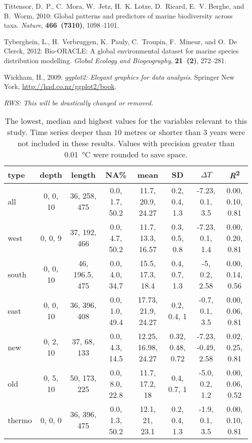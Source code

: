 \documentclass{ametsoc}
\begin{document}
\begin{thebibliography}{23}
Tittensor, D.~P., C.~Mora, W.~Jetz, H.~K. Lotze, D.~Ricard, E.~V. Berghe, and
  B.~Worm, 2010: {Global patterns and predictors of marine biodiversity across
  taxa}. \textit{Nature}, \textbf{466~(7310)}, 1098--1101.

Tyberghein, L., H.~Verbruggen, K.~Pauly, C.~Troupin, F.~Mineur, and O.~{De
  Clerck}, 2012: {Bio-ORACLE: A global environmental dataset for marine species
  distribution modelling}. \textit{Global Ecology and Biogeography},
  \textbf{21~(2)}, 272--281.

Wickham, H., 2009: \textit{ggplot2: Elegant graphics for data analysis}.
  Springer New York, \urlprefix\url{http://had.co.nz/ggplot2/book}.

\end{thebibliography}

%
\emph{RWS: This will be drastically changed or removed.}
\begin{table}[ht]
\caption{\small The lowest, median and highest values for the variables relevant to this study. Time series deeper than 10 metres or shorter than 3 years were not included in these results. Values with precision greater than \SI{0.01}{\degreeCelsius} were rounded to save space.}
\label{range-table}
\centering
\tiny
\begin{tabular}{lccccccc}
\hline
 type & depth & length & NA\% & mean & SD & $\Delta T$ & \emph{R}\textsuperscript{2} \\
 \hline
  all & 0, 0, 10 & 36, 258, 475 & 0.0, 1.7, 50.2 & 11.7, 20.9, 24.27 & 0.2, 0.4, 1.3 & -7.23, 0.1, 3.5 & 0.00, 0.10, 0.81 \\
  west & 0, 0, 9 & 37, 192, 466 & 0.0, 4.7, 50.2 & 11.7, 13.3, 16.57 & 0.3, 0.5, 0.8 & -7.23, 0.1, 1.4 & 0.00, 0.20, 0.81 \\
  south & 0, 0, 10 & 46, 196.5, 475 & 0.0, 4.0, 34.7 & 15.5, 17.3, 18.4 & 0.4, 0.7, 1.3 & -5, 0.2, 2.58 & 0.00, 0.14, 0.56 \\
  east & 0, 0, 10 & 36, 396, 408 & 0.0, 1.0, 49.4 & 17.73, 21.9, 24.27 & 0.2, 0.4, 1 & -0.7, 0.1, 3.5 & 0.00, 0.06, 0.81 \\
  new & 0, 2, 10 & 37, 68, 133 & 0.0, 4.3, 14.5 & 12.25, 16.98, 24.27 & 0.32, 0.48, 0.72 & -7.23, -0.49, 2.58 & 0.02, 0.25, 0.81 \\
  old & 0, 5, 10 & 50, 173, 225 & 0.0, 8.0, 22.8 & 11.7, 17.2, 18 & 0.4, 0.7, 1 & -5.0, 0.2, 1.2 & 0.00, 0.06, 0.52 \\
  thermo & 0, 0, 0 & 36, 396, 475 & 0.0, 1.3, 50.2 & 12.1, 21, 23.1 & 0.2, 0.4, 1.3 & -1.9, 0.1, 3.5 & 0.00, 0.10, 0.81 \\
  \hline
  \end{tabular}
\end{table}
\end{document}
